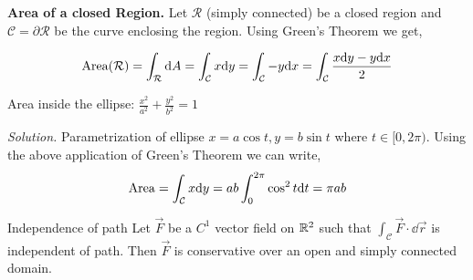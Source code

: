 \documentclass[../Analysis-3.tex]{subfiles}
\begin{document}
\begin{tcolorbox}
  \textbf{Area of a closed Region.} Let $\mathcal{R}$ (simply connected) be a closed region and $\mathcal{C} = \partial{\mathcal{R}}$ be the curve enclosing the region. Using Green's Theorem we get,

  \[\operatorname{Area}(\mathcal{R}) = \int_{\mathcal{R}} \dd A = \int_{\mathcal{C}} x \dd y = \int_{\mathcal{C}} -y \dd x = \int_{\mathcal{C}} \frac{x \dd y -y \dd x}{2} \]

\end{tcolorbox}

\begin{Eg}{Area inside the ellipse: $\frac{x^2}{a^2} + \frac{y^2}{b^2} = 1$}{}

  \textit{Solution.} Parametrization of ellipse $x = a \cos t, y = b \sin t$ where $t \in [0,2\pi)$. Using the above application of Green's Theorem we can write,
  \[\operatorname{Area} = \int_{\mathcal{C}} x \dd y = ab \int_{0}^{2\pi} \cos^2t \dd t = \pi ab \]
\end{Eg}

\begin{Thm}{Independence of path}{}
  Let $\vec{F}$ be a $C^1$ vector field on $\mathbb{R}^2$ such that $\displaystyle\int_{\mathcal{C}} \vec{F} \cdot \dd \vec{r}$ is independent of path. Then $\vec{F}$ is conservative over an open and simply connected domain.
\end{Thm}
\end{document}
